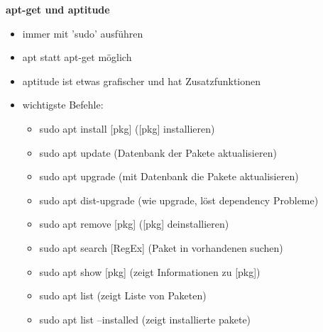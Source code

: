 \documentclass[12pt,utf8, 10pt]{article}
\begin{document}
\twocolumn
\scriptsize
\textbf{apt-get und aptitude}
\begin{itemize}
	\item immer mit 'sudo' ausführen
	\item apt statt apt-get möglich
	\item aptitude ist etwas grafischer und hat Zusatzfunktionen
	\item wichtigste Befehle:
	\begin{itemize}
		\item sudo apt install [pkg] ([pkg] installieren)
		\item sudo apt update (Datenbank der Pakete aktualisieren)
		\item sudo apt upgrade (mit Datenbank die Pakete aktualisieren)
		\item sudo apt dist-upgrade (wie upgrade, löst dependency Probleme)
		\item sudo apt remove [pkg] ([pkg] deinstallieren)
		\item sudo apt search [RegEx] (Paket in vorhandenen suchen)
		\item sudo apt show [pkg] (zeigt Informationen zu [pkg])
		\item sudo apt list (zeigt Liste von Paketen)
		\item sudo apt list --installed (zeigt installierte pakete)
	\end{itemize}
\end{itemize}
\end{document}
